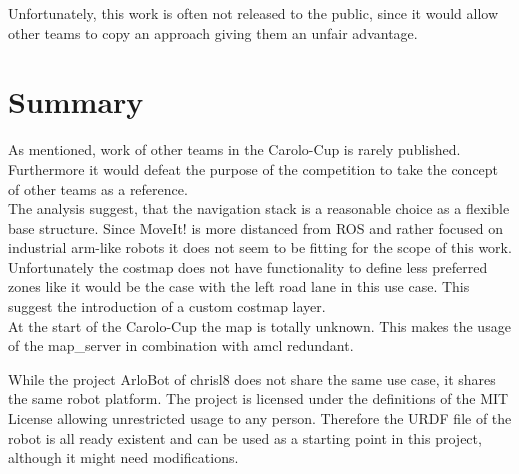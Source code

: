 Unfortunately, this work is often not released to the public, since it would allow other teams to copy an approach giving them an unfair advantage.\\

\section{Summary}
As mentioned, work of other teams in the Carolo-Cup is rarely published. Furthermore it would defeat the purpose of the competition to take the concept of other teams as a reference.\\

The analysis suggest, that the navigation stack is a reasonable choice as a flexible base structure. Since MoveIt! is more distanced from ROS and rather focused on industrial arm-like robots it does not seem to be fitting for the scope of this work.\\

Unfortunately the costmap does not have functionality to define less preferred zones like it would be the case with the left road lane in this use case. This suggest the introduction of a custom costmap layer.\\

At the start of the Carolo-Cup the map is totally unknown. This makes the usage of the map\_server in combination with amcl redundant.

While the project ArloBot of chrisl8 does not share the same use case, it shares the same robot platform. The project is licensed under the definitions of the MIT License allowing unrestricted usage to any person. Therefore the URDF file of the robot is all ready existent and can be used as a starting point in this project, although it might need modifications.













